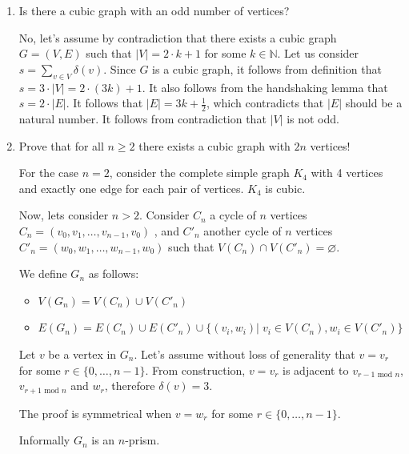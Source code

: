 \begin{enumerate}
\begin{enumerate}
     \item Is there a cubic graph with an odd number of vertices?
     \vspace{1em}
     
No, let's assume by contradiction that there exists a cubic graph
     $G=(V,E)$ such that $\lvert V \rvert = 2 \cdot k +1 $ for some $k \in \mathbb{N}$. Let us consider $s = \sum\limits_{v \in V} \delta (v)$. Since $G$ is a cubic graph, it follows from definition that $s = 3 \cdot \lvert V \rvert = 2 \cdot (3k)+1$. It also follows from the handshaking lemma that $s = 2 \cdot \lvert E  \rvert$. It follows that $\lvert E \rvert = 3k + \frac{1}{2}$, which contradicts that $\lvert E \rvert$ should be a natural number.
     It follows from contradiction that $\lvert V \rvert$ is not odd.
     
     \item Prove that for all $n\geq 2$ there exists a cubic graph with $2n$ vertices!
     \vspace{1em}
     
  For the case $n = 2$, consider the complete simple graph $K_4$ with 4 vertices and exactly one edge for each pair of vertices. $K_4$ is cubic.
     
     Now, lets consider $n>2$. Consider $C_n$ a cycle of $n$ vertices $C_n = (v_0, v_1, \ldots, v_{n-1},v_0)$ , and $C'_n$ another cycle of $n$ vertices $C'_n = (w_0,w_1,\ldots,w_{n-1},w_0)$ such that $V(C_n) \cap V(C'_n) = \varnothing$.
     
     We define $G_n$ as follows: 
     
     \begin{itemize}
         \item $V(G_n) = V(C_n) \cup V(C'_n)$
         \item $E(G_n) = E(C_n) \cup E(C'_n) \cup \{ (v_i,w_i) \vert \; v_i \in V(C_n), w_i \in V(C'_n) \}$
     \end{itemize}
     
     Let $v$ be a vertex in $G_n$. Let's assume without loss of generality that $v = v_r $ for some $r \in \{0,\ldots, n-1\}$. From construction, $v = v_r$ is adjacent to $v_{r-1 \textrm{ mod } n}$, $v_{r+1 \textrm{ mod } n} $ and $w_r$, therefore $\delta(v)=3$.
     
     The proof is symmetrical when $v = w_r$ for some $r \in \{0,\ldots,n-1 \}$.
     
     Informally $G_n$ is an $n$-prism. 
     \begin{center}
         


\end{center}
\end{enumerate}
\end{enumerate}
